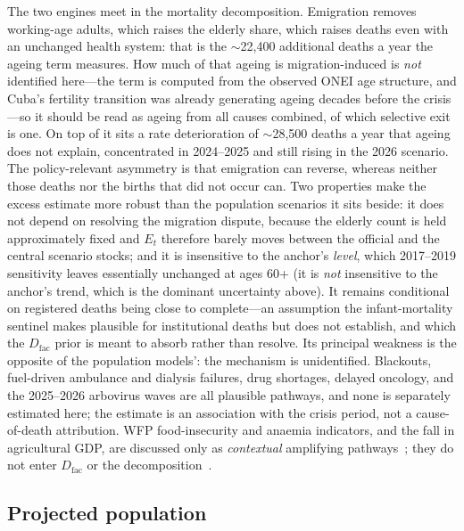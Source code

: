 \documentclass[11pt,a4paper]{article}
\begin{document}
The two engines meet in the mortality decomposition.
Emigration removes working-age adults, which raises the elderly share, which raises deaths even with an unchanged health system: that is the $\sim$22{,}400 additional deaths a year the ageing term measures.
How much of that ageing is migration-induced is \emph{not} identified here---the term is computed from the observed ONEI age structure, and Cuba's fertility transition was already generating ageing decades before the crisis---so it should be read as ageing from all causes combined, of which selective exit is one.
On top of it sits a rate deterioration of $\sim$28{,}500 deaths a year that ageing does not explain, concentrated in 2024--2025 and still rising in the 2026 scenario.
The policy-relevant asymmetry is that emigration can reverse, whereas neither those deaths nor the births that did not occur can.
Two properties make the excess estimate more robust than the population scenarios it sits beside: it does not depend on resolving the migration dispute, because the elderly count is held approximately fixed and $E_t$ therefore barely moves between the official and the central scenario stocks; and it is insensitive to the anchor's \emph{level}, which 2017--2019 sensitivity leaves essentially unchanged at ages 60+ (it is \emph{not} insensitive to the anchor's trend, which is the dominant uncertainty above).
It remains conditional on registered deaths being close to complete---an assumption the infant-mortality sentinel makes plausible for institutional deaths but does not establish, and which the $D_{\mathrm{fac}}$ prior is meant to absorb rather than resolve.
Its principal weakness is the opposite of the population models': the mechanism is unidentified.
Blackouts, fuel-driven ambulance and dialysis failures, drug shortages, delayed oncology, and the 2025--2026 arbovirus waves are all plausible pathways, and none is separately estimated here; the estimate is an association with the crisis period, not a cause-of-death attribution.
WFP food-insecurity and anaemia indicators, and the fall in agricultural GDP, are discussed only as \emph{contextual} amplifying pathways~\citep{wfp_cuba}; they do not enter $D_{\mathrm{fac}}$ or the decomposition~\citep{karlinsky2021,msemburi2023}.


\subsection{Projected population}
\end{document}
